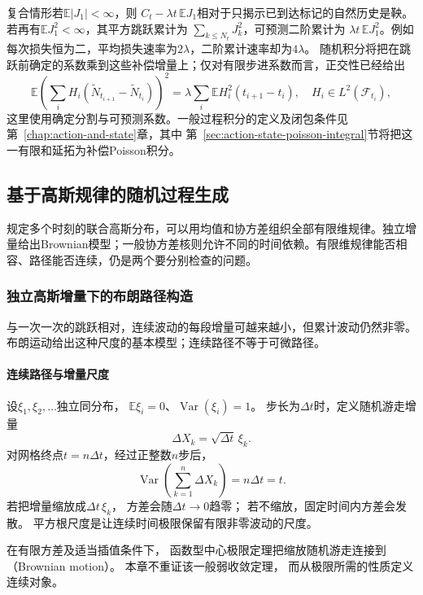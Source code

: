 复合情形若\(\mathbb E|J_1|<\infty\)，则
\(C_t-\lambda t\,\mathbb EJ_1\)相对于只揭示已到达标记的自然历史是鞅。
若再有\(\mathbb EJ_1^2<\infty\)，其平方跳跃累计为
\(\sum_{k\leq N_t}J_k^2\)，可预测二阶累计为
\(\lambda t\,\mathbb EJ_1^2\)。例如每次损失恒为二，平均损失速率为\(2\lambda\)，二阶累计速率却为\(4\lambda\)。
随机积分将把在跳跃前确定的系数乘到这些补偿增量上；仅对有限步进系数而言，正交性已经给出
\[
\mathbb E\left(\sum_iH_i
(\widetilde N_{t_{i+1}}-\widetilde N_{t_i})\right)^2
=\lambda\sum_i\mathbb E H_i^2(t_{i+1}-t_i),
\quad H_i\in L^2(\mathcal F_{t_i}),
\]
这里使用确定分割与可预测系数。一般过程积分的定义及闭包条件见
第~\ref{chap:action-and-state}章，其中
第~\ref{sec:action-state-poisson-integral}节将把这一有限和延拓为补偿Poisson积分。

\subsection{基于高斯规律的随机过程生成}

规定多个时刻的联合高斯分布，可以用均值和协方差组织全部有限维规律。独立增量给出Brownian模型；一般协方差核则允许不同的时间依赖。有限维规律能否相容、路径能否连续，仍是两个要分别检查的问题。
\label{sec:rv-gaussian-generation}


\subsubsection{独立高斯增量下的布朗路径构造}
\label{sec:dynamical-brownian-motion}
与一次一次的跳跃相对，连续波动的每段增量可越来越小，但累计波动仍然非零。布朗运动给出这种尺度的基本模型；连续路径不等于可微路径。

\paragraph{连续路径与增量尺度}

设$\xi_{1},\xi_{2},\ldots$独立同分布， $\mathbb{E}\xi_{i}=0$、$\operatorname{Var}
(\xi_{i})=1$。 步长为$\Delta t$时，定义随机游走增量
\[
	\Delta X_{k}=\sqrt{\Delta t}\,\xi_{k}.
\]
对网格终点$t=n\Delta t$，经过正整数$n$步后，
\[
	\operatorname{Var}\left( \sum_{k=1}^{n}\Delta X_{k}\right) = n\Delta t=t.
\]
若把增量缩放成$\Delta t\,\xi_{k}$， 方差会随$\Delta t\to0$趋零；
若不缩放，固定时间内方差会发散。
平方根尺度是让连续时间极限保留有限非零波动的尺度。

在有限方差及适当插值条件下， 函数型中心极限定理把缩放随机游走连接到（Brownian motion）。 本章不重证该一般弱收敛定理，
而从极限所需的性质定义连续对象。

